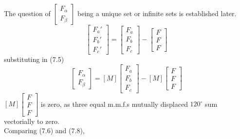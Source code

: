 \documentclass[a4paper,numbers=noenddot,12pt]{scrbook}
\begin{document}
The question of $\displaystyle \begin{bmatrix} F_{\alpha} \\ F_{\beta} \end{bmatrix}$ being a unique set or infinite sets is established later.
\begin{equation}
    \begin{bmatrix}
        F_a' \\F_b' \\ F_c'
    \end{bmatrix}
    =
    \begin{bmatrix}
        F_a \\ F_b \\ F_c
    \end{bmatrix}
    -
    \begin{bmatrix}
        F \\ F \\ F
    \end{bmatrix}
    \label{eq:Eq7.7}
\end{equation}
substituting in (7.5)
\begin{equation}
    \begin{bmatrix}
        F_{\alpha} \\ F_{\beta}
    \end{bmatrix}
    =
    [M]
    \begin{bmatrix}
        F_a \\ F_b \\ F_c 
    \end{bmatrix}
    -
    [M]
    \begin{bmatrix}
        F \\ F \\ F
    \end{bmatrix}
    \label{eq:Eq7.8}
\end{equation}
$[M] \displaystyle \begin{bmatrix} F \\ F \\ F \end{bmatrix}$ is zero, as three equal m.m.f.s mutually displaced $120^{\circ}$ sum vectorially to zero. \\
Comparing (7.6) and (7.8),
\end{document}
